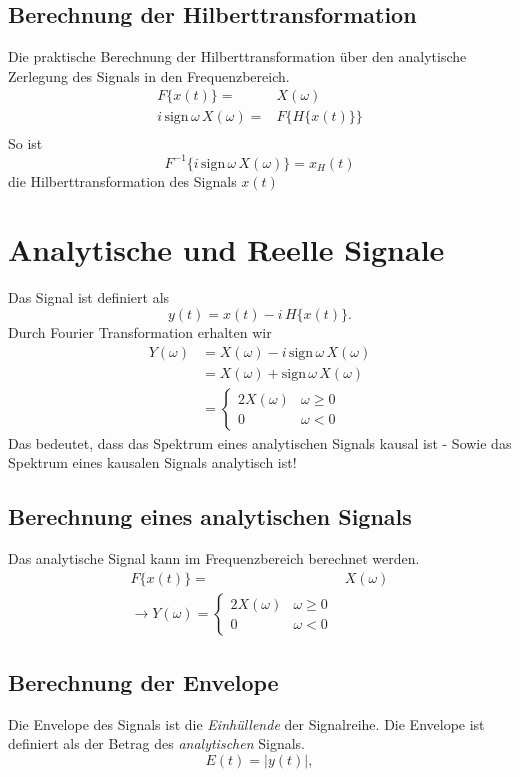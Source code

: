\subsection*{Berechnung der Hilberttransformation}
Die praktische Berechnung der Hilberttransformation über den analytische Zerlegung des Signals in den Frequenzbereich.
\[
\begin{split}
F\{x(t)\} = & X(\omega)\\
i\,\mbox{sign}\,\omega\,X(\omega) = &F\{H\{x(t)\}\}\\
\end{split}
\]
So ist
\[
F^{-1}\{i\,\mbox{sign}\,\omega\,X(\omega)\} = x_H(t)
\]
die Hilberttransformation des Signals $x(t)$

\section{Analytische und Reelle Signale}
Das Signal ist definiert als
\[
y(t) = x(t) - i\,H\{x(t)\}.
\]
Durch Fourier Transformation erhalten wir
\[
\begin{split}
Y(\omega) & = X(\omega) - i \, \mbox{sign}\,\omega \, X(\omega)\\
& = X(\omega) + \mbox{sign}\,\omega \, X(\omega)\\
& =
\begin{cases}
2 X(\omega) & \omega \geq 0\\
0 & \omega < 0
\end{cases}
\end{split}
\]
Das bedeutet, dass das Spektrum eines analytischen Signals kausal ist - Sowie das Spektrum eines kausalen Signals analytisch ist!

\subsection{Berechnung eines analytischen Signals}
Das analytische Signal kann im Frequenzbereich berechnet werden.
\[
\begin{split}
F\{x(t)\} = & X(\omega)\\
\rightarrow Y(\omega) =
\begin{cases}
2 X(\omega) & \omega \geq 0\\
0 & \omega < 0
\end{cases}
\end{split}
\]

\subsection{Berechnung der Envelope}
\label{sec:signalyse_envelope}
Die Envelope des Signals ist die \textit{Einhüllende} der Signalreihe. Die Envelope ist definiert als der Betrag des \textit{analytischen} Signals.
\begin{equation}
E(t) = |y(t)|,
\end{equation} 

